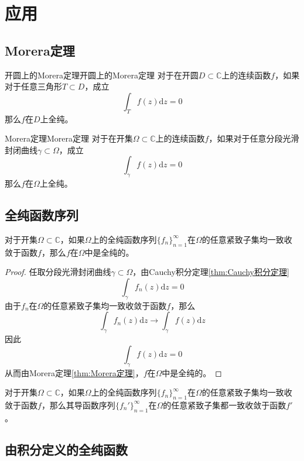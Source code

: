 \documentclass[lang = cn, scheme = chinese, thmcnt = section]{elegantbook}
\newcommand{\C}{\mathbb{C}}  		   %
\newcommand{\sub}{\subset}             %
\newcommand{\dd}{\mathrm{d}}           %
\begin{document}
\section{应用}

\subsection{Morera定理}

\begin{theorem}{开圆上的Morera定理}{开圆上的Morera定理}
	对于在开圆$D\sub\C$上的连续函数$f$，如果对于任意三角形$T\sub D$，成立
	$$
	\int_T{f(z)\mathrm{d}z}=0
	$$
	那么$f$在$D$上全纯。
\end{theorem}

\begin{theorem}{Morera定理}{Morera定理}
	对于在开集$\Omega\sub\C$上的连续函数$f$，如果对于任意分段光滑封闭曲线$\gamma\sub\Omega$，成立
	$$
	\int_\gamma{f(z)\mathrm{d}z}=0
	$$
	那么$f$在$\Omega$上全纯。
\end{theorem}

\subsection{全纯函数序列}

\begin{theorem}
	对于开集$\Omega\sub\C$，如果$\Omega$上的全纯函数序列$\{ f_n \}_{n=1}^{\infty}$在$\Omega$的任意紧致子集均一致收敛于函数$f$，那么$f$在$\Omega$中是全纯的。
\end{theorem}

\begin{proof}
	任取分段光滑封闭曲线$\gamma\sub\Omega$，由Cauchy积分定理\ref{thm:Cauchy积分定理}%
	$$
	\int_\gamma f_n(z)\dd z=0
	$$
	由于$f_n$在$\Omega$的任意紧致子集均一致收敛于函数$f$，那么
	$$
	\int_\gamma f_n(z)\dd z\to \int_\gamma f(z)\dd z
	$$
	因此%
	$$
	\int_\gamma f(z)\dd z=0
	$$
	从而由Morera定理\ref{thm:Morera定理}，$f$在$\Omega$中是全纯的。
\end{proof}

\begin{theorem}
	对于开集$\Omega\sub\C$，如果$\Omega$上的全纯函数序列$\{ f_n \}_{n=1}^{\infty}$在$\Omega$的任意紧致子集均一致收敛于函数$f$，那么其导函数序列$\{ f_n' \}_{n=1}^{\infty}$在$\Omega$的任意紧致子集都一致收敛于函数$f'$。
\end{theorem}

\subsection{由积分定义的全纯函数}
\end{document}
